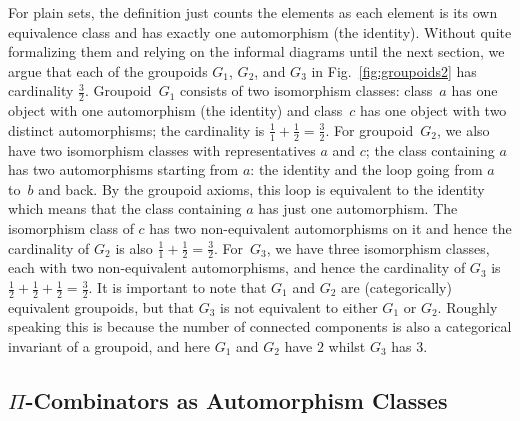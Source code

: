 \documentclass[a4paper,USenglish]{lipics-v2016-utf8x}
\begin{document}
For plain sets, the definition just counts the elements as each element is its
own equivalence class and has exactly one automorphism (the identity). Without
quite formalizing them and relying on the informal diagrams until the next
section, we argue that each of the groupoids $G_1$, $G_2$, and $G_3$ in
Fig.~\ref{fig:groupoids2} has cardinality $\frac{3}{2}$. Groupoid~$G_1$ consists
of two isomorphism classes: class~$a$ has one object with one automorphism (the
identity) and class~$c$ has one object with two distinct automorphisms; the
cardinality is $\frac{1}{1} + \frac{1}{2} = \frac{3}{2}$. For groupoid~$G_2$, we
also have two isomorphism classes with representatives $a$ and $c$; the class
containing $a$ has two automorphisms starting from $a$: the identity and the
loop going from $a$ to~$b$ and back. By the groupoid axioms, this loop is
equivalent to the identity which means that the class containing $a$ has just
one automorphism. The isomorphism class of $c$ has two non-equivalent
automorphisms on it and hence the cardinality of $G_2$ is also
$\frac{1}{1} + \frac{1}{2} = \frac{3}{2}$. For~$G_3$, we have three isomorphism
classes, each with two non-equivalent automorphisms, and hence the cardinality
of $G_3$ is $\frac{1}{2} + \frac{1}{2} + \frac{1}{2} = \frac{3}{2}$.  It is
important to note that $G_1$ and $G_2$ are (categorically) equivalent groupoids,
but that $G_3$ is not equivalent to either $G_1$ or $G_2$.  Roughly speaking
this is because the number of connected components is also a categorical
invariant of a groupoid, and here $G_1$ and $G_2$ have $2$ whilst $G_3$ has $3$.

\subsection{$\Pi$-Combinators as Automorphism Classes}
\end{document}
